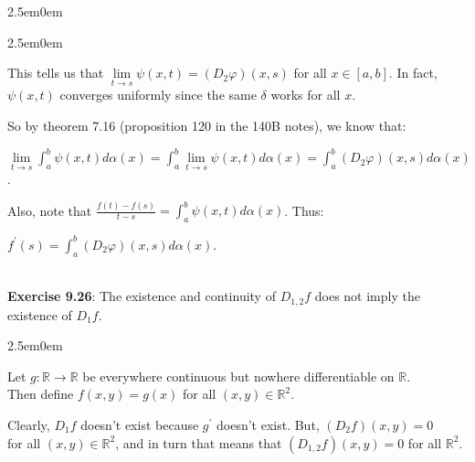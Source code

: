 \documentclass{book}
\newcommand{\exOne}{%
   \color{Purple}%
   \fontsize{14}{16}\selectfont%
}
\newcommand{\exTwo}{%
   \color{RedViolet}%
   \fontsize{13}{15}\selectfont%
}
\newenvironment{myIndent}{%
   \begin{adjustwidth}{2.5em}{0em}%
}{%
   \end{adjustwidth}%
}
\newcommand{\mySepTwo}[1][.]{%
   {\noindent\color{#1}{\rule{6.5in}{0.5mm}}}\\%
}
\newcommand{\retTwo}{\hfill\bigbreak}
\begin{document}
{\begin{myIndent}
{\begin{myIndent}
      This tells us that $\lim\limits_{t\rightarrow s}\psi(x, t) = (D_2\varphi)(x, s)$ for all $x \in [a, b]$. In fact,\\ [-1pt] $\psi(x, t)$ converges uniformly since the same $\delta$ works for all $x$.\retTwo 
      
      So by theorem 7.16 (proposition 120 in the 140B notes), we know that:
      
      {\center $\lim\limits_{t\rightarrow s}\int_a^b\psi(x, t)d\alpha(x)  = \int_a^b \lim\limits_{t\rightarrow s}\psi(x, t)d\alpha(x) = \int_a^b (D_2\varphi)(x, s)d\alpha(x)$.\retTwo\par}

      Also, note that $\frac{f(t) - f(s)}{t - s} = \int_a^b \psi(x, t) d\alpha(x)$. Thus:
      
      {\center$f^\prime(s) = \int_a^b (D_2\varphi)(x, s)d\alpha(x)$.\retTwo\par}
   \end{myIndent}}
\end{myIndent}}

\exOne
\mySepTwo

\textbf{Exercise 9.26}: The existence and continuity of $D_{1,2}f$ does not imply the\\ existence of $D_1f$.

{\begin{myIndent}\exTwo
   Let $g: \mathbb{R} \longrightarrow \mathbb{R}$ be everywhere continuous but nowhere differentiable on $\mathbb{R}$.\\ Then define $f(x, y) = g(x)$ for all $(x, y) \in \mathbb{R}^2$.\retTwo

   Clearly, $D_1f$ doesn't exist because $g^\prime$ doesn't exist. But, $(D_2f)(x, y) = 0$\\ for all $(x, y) \in \mathbb{R}^2$, and in turn that means that $(D_{1,2}f)(x,y) = 0$ for all $\mathbb{R}^2$.\retTwo
\end{myIndent}}

\mySepTwo

\newpage
\end{document}
